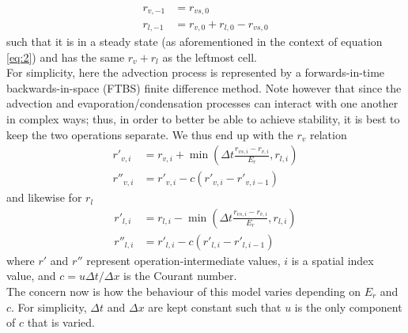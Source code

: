 \documentclass[11pt]{article}
\begin{document}
\begin{align}
r_{v,-1} &= r_{vs,0} \label{eq:a} \\
r_{l,-1} &= r_{v,0}+r_{l,0}-r_{vs,0} \label{eq:b}
\end{align}
such that it is in a steady state (as aforementioned in the context of equation \ref{eq:2}) and has the same $r_v+r_l$ as the leftmost cell. \\
For simplicity, here the advection process is represented by a forwards-in-time backwards-in-space (FTBS) finite difference method. Note however that since the advection and evaporation/condensation processes can interact with one another in complex ways; thus, in order to better be able to achieve stability, it is best to keep the two operations separate. We thus end up with the $r_v$ relation
\begin{align} \label{eq:4}
r'_{v,i} &= r_{v,i} + \min\left(\Delta t\frac{r_{vs,i} - r_{v,i}}{E_r},r_{l,i}\right) \\ \label{eq:5}
r''_{v,i} &= r'_{v,i} - c\left(r'_{v,i} - r'_{v,i-1}\right)
\end{align}
and likewise for $r_l$
\begin{align} \label{eq:6}
r'_{l,i} &= r_{l,i} - \min\left(\Delta t\frac{r_{vs,i} - r_{v,i}}{E_r},r_{l,i}\right) \\ \label{eq:7}
r''_{l,i} &= r'_{l,i} - c\left(r'_{l,i} - r'_{l,i-1}\right)
\end{align}
where $r'$ and $r''$ represent operation-intermediate values, $i$ is a spatial index value, and $c=u \Delta t/\Delta x$ is the Courant number. \\
The concern now is how the behaviour of this model varies depending on $E_r$ and $c$. For simplicity, $\Delta t$ and $\Delta x$ are kept constant such that $u$ is the only component of $c$ that is varied.
\end{document}
